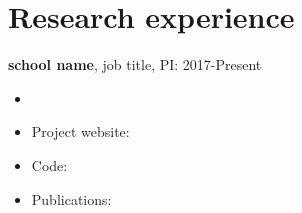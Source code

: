 
\section*{Research experience}
\textbf{school name}, job title, PI: \todo{}\hfill 2017-Present
	
		\emph{}
		\begin{itemize}
			\item {}
			\item Project website:
			\item Code:
			\item Publications: 
		\end{itemize}
